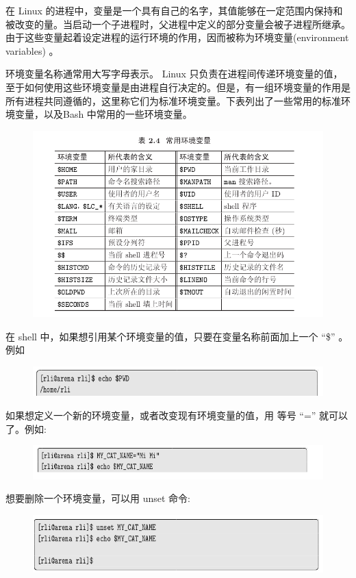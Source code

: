 \documentclass[12pt，a4paper]{article}
\numberwithin{equation}{section}
\begin{document}
在 Linux 的进程中，变量是一个具有自己的名字，其值能够在一定范围内保持和被改变的量。当启动一个子进程时，父进程中定义的部分变量会被子进程所继承。由于这些变量起着设定进程的运行环境的作用，因而被称为环境变量(environment variables) 。

环境变量名称通常用大写字母表示。 Linux 只负责在进程间传递环境变量的值，至于如何使用这些环境变量是由进程自行决定的。但是，有一组环境变量的作用是所有进程共同遵循的，这里称它们为标准环境变量。下表列出了一些常用的标准环境变量，以及Bash 中常用的一些环境变量。
\begin{figure}[H]
\centering
\includegraphics[scale=0.6]{./figures/273.png}
\end{figure}
在 shell 中，如果想引用某个环境变量的值，只要在变量名称前面加上一个 “\$” 。例如
\begin{figure}[H]
\centering
\includegraphics[scale=0.6]{./figures/238.png}
\end{figure}
如果想定义一个新的环境变量，或者改变现有环境变量的值，用
等号 “=” 就可以了。例如:
\begin{figure}[H]
\centering
\includegraphics[scale=0.6]{./figures/239.png}
\end{figure}
想要删除一个环境变量，可以用 unset 命令:
\begin{figure}[H]
\centering
\includegraphics[scale=0.6]{./figures/240.png}
\end{figure}
\end{document}
